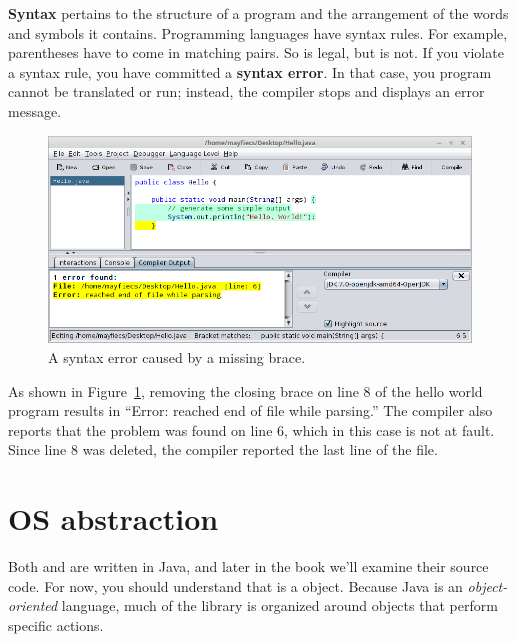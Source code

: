 
{\bf Syntax} pertains to the structure of a program and the arrangement of the words and symbols it contains.
Programming languages have syntax rules.
For example, parentheses have to come in matching pairs.
So  is legal, but  is not.
If you violate a syntax rule, you have committed a {\bf syntax error}.
In that case, you program cannot be translated or run; instead, the compiler stops and displays an error message.

\begin{figure}[!h]
\begin{center}
\includegraphics[width=\textwidth]{figs/syntax-error.png}
\caption{A syntax error caused by a missing brace.}
\label{fig:syntax}
\end{center}
\end{figure}

As shown in Figure~\ref{fig:syntax}, removing the closing brace on line 8 of the hello world program results in ``Error: reached end of file while parsing.''
The compiler also reports that the problem was found on line 6, which in this case is not at fault.
Since line 8 was deleted, the compiler reported the last line of the file.


\section{OS abstraction}


Both  and  are written in Java, and later in the book we'll examine their source code.
For now, you should understand that  is a  object.
Because Java is an {\em object-oriented} language, much of the library is organized around objects that perform specific actions.

